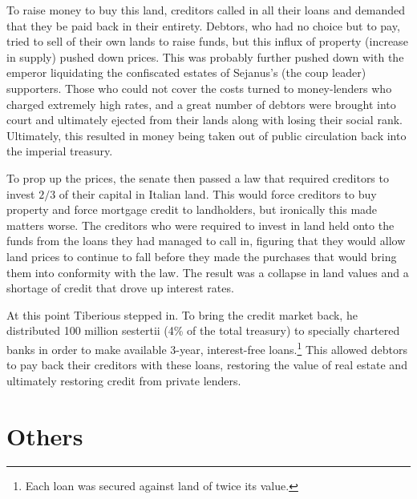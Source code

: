 \documentclass{article}
\begin{document}
    To raise money to buy this land, creditors called in all their loans and demanded that they be paid back in their entirety. Debtors, who had no choice but to pay, tried to sell of their own lands to raise funds, but this influx of property (increase in supply) pushed down prices. This was probably further pushed down with the emperor liquidating the confiscated estates of Sejanus's (the coup leader) supporters. Those who could not cover the costs turned to money-lenders who charged extremely high rates, and a great number of debtors were brought into court and ultimately ejected from their lands along with losing their social rank. Ultimately, this resulted in money being taken out of public circulation back into the imperial treasury. 

    To prop up the prices, the senate then passed a law that required creditors to invest $2/3$ of their capital in Italian land. This would force creditors to buy property and force mortgage credit to landholders, but ironically this made matters worse. The creditors who were required to invest in land held onto the funds from the loans they had managed to call in, figuring that they would allow land prices to continue to fall before they made the purchases that would bring them into conformity with the law. The result was a collapse in land values and a shortage of credit that drove up interest rates. 

    At this point Tiberious stepped in. To bring the credit market back, he distributed 100 million sestertii (4\% of the total treasury) to specially chartered banks in order to make available 3-year, interest-free loans.\footnote{Each loan was secured against land of twice its value.} This allowed debtors to pay back their creditors with these loans, restoring the value of real estate and ultimately restoring credit from private lenders. 

\section{Others}
\end{document}
